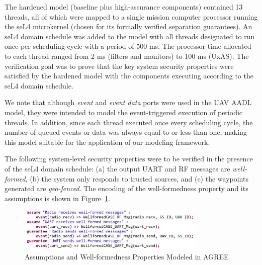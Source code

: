 The hardened model (baseline plus high-assurance components) contained 13 threads,
all of which were mapped to a single mission computer processor running the seL4 microkernel (chosen for its formally verified separation guarantees).
An seL4 domain schedule was added to the model with all threads designated to run once per scheduling cycle with a period of 500 ms.
The processor time allocated to each thread ranged from 2 ms (filters and monitors) to 100 ms (UxAS).
The verification goal was to prove that the key system security properties were satisfied by the hardened model with the components executing according to the seL4 domain schedule.

We note that although \textit{event} and \textit{event data} ports were used in the UAV AADL model, they were intended to model the event-triggered execution of periodic threads.
In addition, since each thread executed once every scheduling cycle, the number of queued events or data was always equal to or less than one,
making this model suitable for the application of our modeling framework.

The following system-level security properties were to be verified in the presence of the seL4 domain schedule:
(a) the output UART and RF messages are \emph{well-formed},
(b) the system only responds to trusted sources, and
(c) the waypoints generated are \emph{geo-fenced}.
The encoding of the well-formedness property and its assumptions is shown in Figure~\ref{wellformed}. 

\begin{figure}[t!]
\centering
\includegraphics[width=90mm]{wellformed.jpg}
\caption{Assumptions and Well-formedness Properties Modeled in AGREE \label{wellformed}}
\end{figure}

